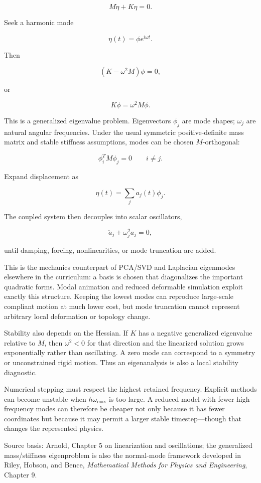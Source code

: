 \[
M\ddot\eta+K\eta=0.
\]

Seek a harmonic mode

\[
\eta(t)=\phi e^{i\omega t}.
\]

Then

\[
(K-\omega^2M)\phi=0,
\]

or

\[
\boxed{
K\phi=\omega^2M\phi.
}
\]

This is a generalized eigenvalue problem. Eigenvectors \(\phi_j\) are mode shapes; \(\omega_j\) are natural angular frequencies. Under the usual symmetric positive-definite mass matrix and stable stiffness assumptions, modes can be chosen \(M\)-orthogonal:

\[
\phi_i^T M\phi_j=0
\qquad i\neq j.
\]

Expand displacement as

\[
\eta(t)=\sum_j a_j(t)\phi_j.
\]

The coupled system then decouples into scalar oscillators,

\[
\ddot a_j+\omega_j^2a_j=0,
\]

until damping, forcing, nonlinearities, or mode truncation are added.

This is the mechanics counterpart of PCA/SVD and Laplacian eigenmodes elsewhere in the curriculum: a basis is chosen that diagonalizes the important quadratic forms. Modal animation and reduced deformable simulation exploit exactly this structure. Keeping the lowest modes can reproduce large-scale compliant motion at much lower cost, but mode truncation cannot represent arbitrary local deformation or topology change.

Stability also depends on the Hessian. If \(K\) has a negative generalized eigenvalue relative to \(M\), then \(\omega^2<0\) for that direction and the linearized solution grows exponentially rather than oscillating. A zero mode can correspond to a symmetry or unconstrained rigid motion. Thus an eigenanalysis is also a local stability diagnostic.

Numerical stepping must respect the highest retained frequency. Explicit methods can become unstable when \(h\omega_{\max}\) is too large. A reduced model with fewer high-frequency modes can therefore be cheaper not only because it has fewer coordinates but because it may permit a larger stable timestep---though that changes the represented physics.

Source basis: Arnold, Chapter 5 on linearization and oscillations; the generalized mass/stiffness eigenproblem is also the normal-mode framework developed in Riley, Hobson, and Bence, \emph{Mathematical Methods for Physics and Engineering}, Chapter 9.

